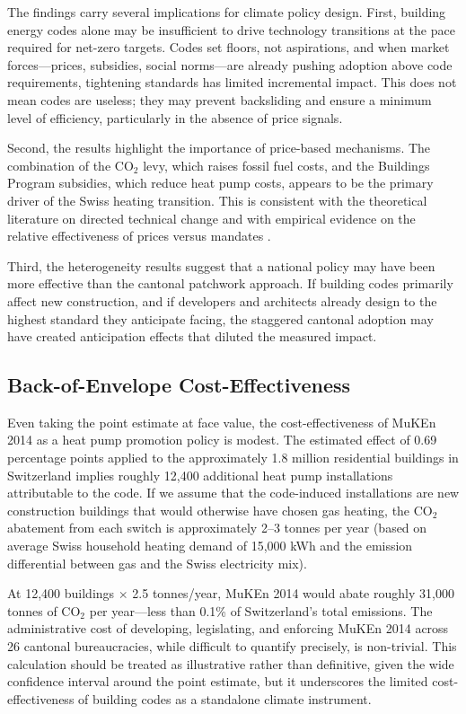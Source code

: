 \documentclass[12pt]{article}
\begin{document}
The findings carry several implications for climate policy design. First, building energy codes alone may be insufficient to drive technology transitions at the pace required for net-zero targets. Codes set floors, not aspirations, and when market forces---prices, subsidies, social norms---are already pushing adoption above code requirements, tightening standards has limited incremental impact. This does not mean codes are useless; they may prevent backsliding and ensure a minimum level of efficiency, particularly in the absence of price signals.

Second, the results highlight the importance of price-based mechanisms. The combination of the CO$_2$ levy, which raises fossil fuel costs, and the Buildings Program subsidies, which reduce heat pump costs, appears to be the primary driver of the Swiss heating transition. This is consistent with the theoretical literature on directed technical change \citep{acemoglu2012environment, aghion2016carbon} and with empirical evidence on the relative effectiveness of prices versus mandates \citep{gillingham2018cost}.

Third, the heterogeneity results suggest that a national policy may have been more effective than the cantonal patchwork approach. If building codes primarily affect new construction, and if developers and architects already design to the highest standard they anticipate facing, the staggered cantonal adoption may have created anticipation effects that diluted the measured impact.

\subsection{Back-of-Envelope Cost-Effectiveness}

Even taking the point estimate at face value, the cost-effectiveness of MuKEn 2014 as a heat pump promotion policy is modest. The estimated effect of 0.69 percentage points applied to the approximately 1.8 million residential buildings in Switzerland implies roughly 12,400 additional heat pump installations attributable to the code. If we assume that the code-induced installations are new construction buildings that would otherwise have chosen gas heating, the CO$_2$ abatement from each switch is approximately 2--3 tonnes per year (based on average Swiss household heating demand of 15,000 kWh and the emission differential between gas and the Swiss electricity mix).

At 12,400 buildings $\times$ 2.5 tonnes/year, MuKEn 2014 would abate roughly 31,000 tonnes of CO$_2$ per year---less than 0.1\% of Switzerland's total emissions. The administrative cost of developing, legislating, and enforcing MuKEn 2014 across 26 cantonal bureaucracies, while difficult to quantify precisely, is non-trivial. This calculation should be treated as illustrative rather than definitive, given the wide confidence interval around the point estimate, but it underscores the limited cost-effectiveness of building codes as a standalone climate instrument.
\end{document}
